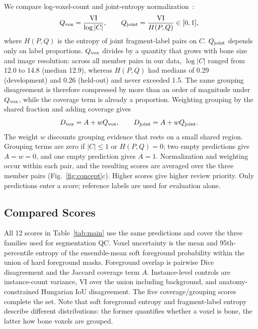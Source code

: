 \documentclass[conference]{IEEEtran}
\begin{document}
We compare log-voxel-count and joint-entropy normalization~\cite{vinh2010}:
\begin{equation}
Q_{\rm vox}=\frac{\mathrm{VI}}{\log|C|},\qquad Q_{\rm joint}=\frac{\mathrm{VI}}{H(P,Q)}\in[0,1],
\end{equation}
where $H(P,Q)$ is the entropy of joint fragment-label pairs on $C$. $Q_{\rm joint}$ depends only on label proportions. $Q_{\rm vox}$ divides by a quantity that grows with bone size and image resolution: across all member pairs in our data, $\log|C|$ ranged from 12.0 to 14.8 (median 12.9), whereas $H(P,Q)$ had medians of 0.29 (development) and 0.26 (held-out) and never exceeded 1.5. The same grouping disagreement is therefore compressed by more than an order of magnitude under $Q_{\rm vox}$, while the coverage term is already a proportion. Weighting grouping by the shared fraction and adding coverage gives
\begin{equation}
D_{\rm vox}=A+wQ_{\rm vox},\qquad D_{\rm joint}=A+wQ_{\rm joint}.
\end{equation}
The weight $w$ discounts grouping evidence that rests on a small shared region. Grouping terms are zero if $|C|\leq1$ or $H(P,Q)=0$; two empty predictions give $A=w=0$, and one empty prediction gives $A=1$. Normalization and weighting occur within each pair, and the resulting scores are averaged over the three member pairs (Fig.~\ref{fig:concept}c). Higher scores give higher review priority. Only predictions enter a score; reference labels are used for evaluation alone.

\subsection{Compared Scores}
All 12 scores in Table~\ref{tab:main} use the same predictions and cover the three families used for segmentation QC. Voxel uncertainty is the mean and 95th-percentile entropy of the ensemble-mean soft foreground probability within the union of hard foreground masks. Foreground overlap is pairwise Dice disagreement and the Jaccard coverage term $A$. Instance-level controls are instance-count variance, VI over the union including background, and anatomy-constrained Hungarian IoU disagreement. The five coverage/grouping scores complete the set. Note that soft foreground entropy and fragment-label entropy describe different distributions: the former quantifies whether a voxel is bone, the latter how bone voxels are grouped.
\end{document}
